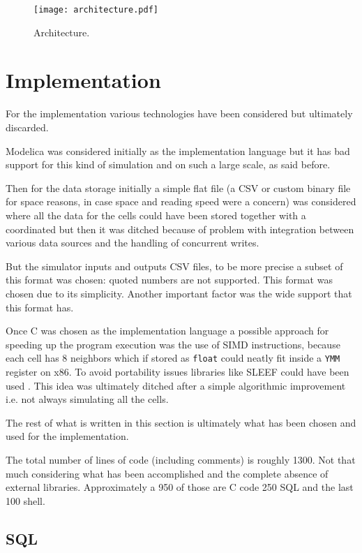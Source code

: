 \documentclass[Lau]{sapthesis} %
\let\oldsection\section
\def\subsection{\oldsection}
\def\section{\chapter}
\begin{document}
\begin{figure}
\centering
\texttt{[image: architecture.pdf]}
\caption{Architecture.}
\label{fig:architecture}
\end{figure}

\section{Implementation}%

For the implementation various technologies have been considered but ultimately
discarded.

Modelica was considered initially as the implementation language but it has bad
support for this kind of simulation and on such a large scale, as said before.

Then for the data storage initially a simple flat file (a CSV \cite{csv} or
custom binary file for space reasons, in case space and reading speed were a
concern) was considered where all the data for the cells could have been stored
together with a coordinated but then it was ditched because of problem with
integration between various data sources and the handling of concurrent writes.

But the simulator inputs and outputs CSV files, to be more precise a subset of
this format was chosen: quoted numbers are not supported. This format was chosen
due to its simplicity. Another important factor was the wide support that this
format has.

Once C was chosen as the implementation language a possible approach for
speeding up the program execution was the use of SIMD instructions, because each
cell has 8 neighbors which if stored as \texttt{float} could neatly fit inside a
\texttt{YMM} register on x86. To avoid portability issues libraries like SLEEF
could have been used \cite{sleef}. This idea was ultimately ditched after a
simple algorithmic improvement i.e. not always simulating all the cells.

The rest of what is written in this section is ultimately what has been chosen
and used for the implementation.

The total number of lines of code (including comments) is roughly 1300. Not that
much considering what has been accomplished and the complete absence of external
libraries. Approximately a 950 of those are C code 250 SQL and the last 100
shell.

\subsection{SQL}
\end{document}
